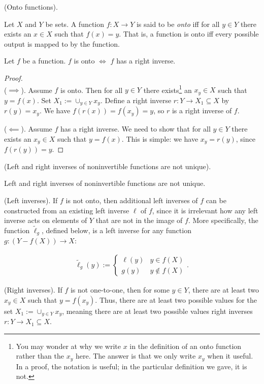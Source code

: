 \begin{defn}
    (Onto functions).

    Let $X$ and $Y$ be sets. A function $f:X \rightarrow Y$ is said to be \textit{onto} iff for all $y \in Y$ there exists an $x \in X$ such that $f(x) = y$. That is, a function is onto iff every possible output is mapped to by the function. 
\end{defn}

\begin{theorem}
    Let $f$ be a function. $f$ is onto $\iff$ $f$ has a right inverse.
\end{theorem}

\begin{proof}
    \mbox{} \\

    ($\implies$). Assume $f$ is onto. Then for all $y \in Y$ there exists\footnote{You may wonder at why we write $x$ in the definition of an onto function rather than the $x_y$ here. The answer is that we only write $x_y$ when it useful. In a proof, the notation is useful; in the particular definition we gave, it is not.} an $x_y \in X$ such that $y = f(x)$. Set $X_1 := \cup_{y \in Y} x_y$. Define a right inverse $r:Y \rightarrow X_1 \subseteq X$ by $r(y) = x_y$. We have $f(r(x)) = f(x_y) = y$, so $r$ is a right inverse of $f$.

    ($\impliedby$). Assume $f$ has a right inverse. We need to show that for all $y \in Y$ there exists an $x_y \in X$ such that $y = f(x)$. This is simple: we have $x_y = r(y)$, since $f(r(y)) = y$.
\end{proof}

\begin{remark}
    (Left and right inverses of noninvertible functions are not unique).

    Left and right inverses of noninvertible functions are not unique.

    (Left inverses). If $f$ is not onto, then additional left inverses of $f$ can be constructed from an existing left inverse $\ell$ of $f$, since it is irrelevant how any left inverse acts on elements of $Y$ that are not in the image of $f$. More specifically, the function $\widetilde{\ell}_g$, defined below, is a left inverse for any function $g:(Y - f(X)) \rightarrow X$:

    \begin{align*}
        \widetilde{\ell}_g(y) :=
        \begin{cases}
            \ell(y) & y \in f(X) \\
            g(y) & y \notin f(X)
        \end{cases}.
    \end{align*}

    
    (Right inverses). If $f$ is not one-to-one, then for some $y \in Y$, there are at least two $x_y \in X$ such that $y = f(x_y)$. Thus, there are at least two possible values for the set $X_1 := \cup_{y \in Y} x_y$, meaning there are at least two possible values right inverses $r:Y \rightarrow X_1 \subseteq X$.
\end{remark}

